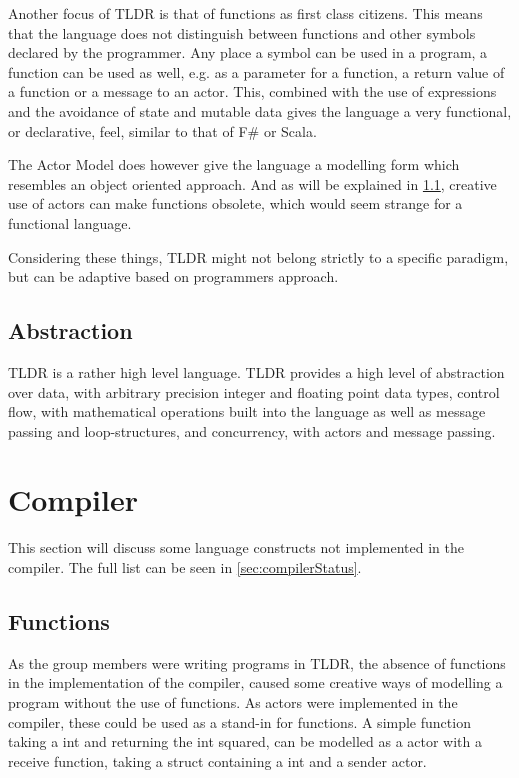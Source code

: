 Another focus of TLDR is that of functions as first class citizens. This means that the language does not distinguish between functions and other symbols declared by the programmer. Any place a symbol can be used in a program, a function can be used as well, e.g. as a parameter for a function, a return value of a function or a message to an actor. This, combined with the use of expressions and the avoidance of state and mutable data gives the language a very functional, or declarative, feel, similar to that of F\# or Scala.

The Actor Model does however give the language a modelling form which resembles an object oriented approach. And as will be explained in \cref{dis:func}, creative use of actors can make functions obsolete, which would seem strange for a functional language.

Considering these things, TLDR might not belong strictly to a specific paradigm, but can be adaptive based on programmers approach.

\subsection{Abstraction}
TLDR is a rather high level language. TLDR provides a high level of abstraction over data, with arbitrary precision integer and floating point data types, control flow, with mathematical operations built into the language as well as message passing and loop-structures, and concurrency, with actors and message passing.

\section{Compiler}

This section will discuss some language constructs not implemented in the compiler. The full list can be seen in \cref{sec:compilerStatus}.

\subsection{Functions}\label{dis:func}

As the group members were writing programs in TLDR, the absence of functions in the implementation of the compiler, caused some creative ways of modelling a program without the use of functions. As actors were implemented in the compiler, these could be used as a stand-in for functions. A simple function taking a int and returning the int squared, can be modelled as a actor with a receive function, taking a struct containing a int and a sender actor. 

